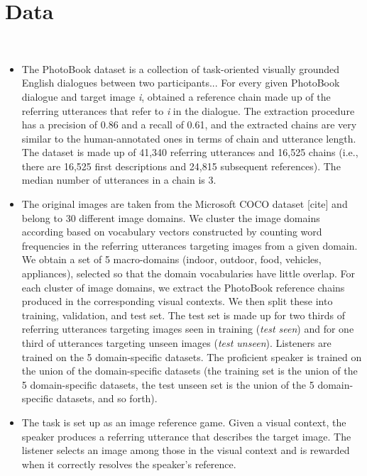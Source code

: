 
\section{Data}
\label{sec:data}

\\

\begin{itemize}
\item The PhotoBook dataset \citep{haber2019photobook} is a collection of task-oriented visually grounded English dialogues between two participants...
For every given PhotoBook dialogue and target image \emph{i}, \citet{takmaz-etal-2020-refer} obtained a reference chain made up of the referring utterances that refer to \emph{i} in the dialogue. The extraction procedure has a precision of 0.86 and a recall of 0.61, and the extracted chains are very similar to the human-annotated ones in terms of chain and utterance length. The dataset is made up of 41,340 referring utterances and 16,525 chains (i.e., there are 16,525 first descriptions and 24,815 subsequent references). The median number of utterances in a chain is 3.
\item The original images are taken from the Microsoft COCO dataset [cite] and belong to 30 different image domains. We cluster the image domains according based on vocabulary vectors constructed by counting word frequencies in the referring utterances targeting images from a given domain. We obtain a set of 5 macro-domains (indoor, outdoor, food, vehicles, appliances), selected so that the domain vocabularies have little overlap. 
For each cluster of image domains, we extract the PhotoBook reference chains produced in the corresponding visual contexts. We then split these into training, validation, and test set. The test set is made up for two thirds of referring utterances targeting images seen in training (\textit{test seen}) and for one third of utterances targeting unseen images (\textit{test unseen}). 
Listeners are trained on the 5 domain-specific datasets. The proficient speaker is trained on the union of the domain-specific datasets (the training set is the union of the 5 domain-specific datasets, the test unseen set is the union of the 5 domain-specific datasets, and so forth).
\item The task is set up as an image reference game. Given a visual context, the speaker produces a referring utterance that describes the target image. The listener selects an image among those in the visual context and is rewarded when it correctly resolves the speaker's reference.
\end{itemize}



